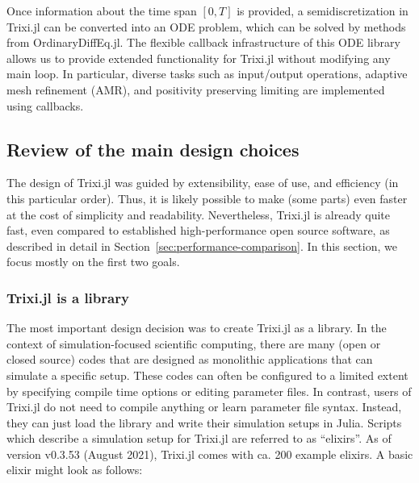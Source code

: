 \documentclass{juliacon}
\makeatletter
\newcommand{\ca}[0]{{ca.\@}\xspace}
\newcommand{\trixi}{Trixi.jl\xspace}
\makeatother
\begin{document}
Once information about the time span $[0, T]$ is provided, a semidiscretization
in \trixi can be converted into an ODE problem, which can be solved by methods 
from OrdinaryDiffEq.jl. The flexible callback infrastructure of this ODE library
allows us to provide extended functionality for \trixi without modifying any
main loop. In particular, diverse tasks such as input/output operations, adaptive
mesh refinement (AMR), and positivity preserving limiting are implemented using
callbacks.


\subsection{Review of the main design choices}

The design of \trixi was guided by extensibility, ease of use, and efficiency
(in this particular order). Thus, it is likely possible to make (some parts) even 
faster at the cost of simplicity and readability. Nevertheless, \trixi is already quite
fast, even compared to established high-performance open source software,
as described in detail in Section~\ref{sec:performance-comparison}. In this
section, we focus mostly on the first two goals.

\subsubsection{\trixi is a library}

The most important design decision was to create \trixi as a library. In the
context of simulation-focused scientific computing, there are many (open
or closed source) codes that are designed as monolithic applications that can
simulate a specific setup. These codes can often be configured to a limited extent 
by specifying compile time options or editing parameter files. In contrast, users of 
\trixi do not need to compile anything or learn parameter file syntax. Instead, they can
just load the library and write their simulation setups in Julia. Scripts which describe
a simulation setup for \trixi are referred to as ``elixirs''. As of version
v0.3.53 (August 2021), \trixi comes with \ca 200 example elixirs. A basic elixir
might look as follows:
\end{document}
